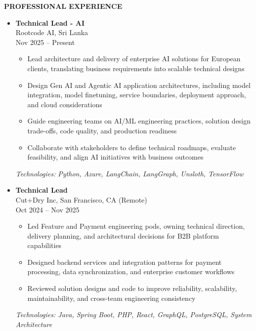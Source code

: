 \documentclass[a4paper,10pt]{article}
\newcommand{\ressection}[1]{
  \vspace{0.2em}
  \noindent\textbf{\large #1}
  \vspace{0.1em}
  \par
}
\begin{document}
\vspace{0.5em}
\ressection{PROFESSIONAL EXPERIENCE}
\begin{itemize}
    \item \textbf{Technical Lead - AI} \\
          Rootcode AI, Sri Lanka \\
          Nov 2025 -- Present
          \begin{itemize}[leftmargin=0.25in,label=$\circ$,itemsep=1pt]
              \item Lead architecture and delivery of enterprise AI solutions for European clients, translating business requirements into scalable technical designs
              \item Design Gen AI and Agentic AI application architectures, including model integration, model finetuning, service boundaries, deployment approach, and cloud considerations
              \item Guide engineering teams on AI/ML engineering practices, solution design trade-offs, code quality, and production readiness
              \item Collaborate with stakeholders to define technical roadmaps, evaluate feasibility, and align AI initiatives with business outcomes
          \end{itemize}
          \textit{Technologies: Python, Azure, LangChain, LangGraph, Unsloth, TensorFlow}
          
    \item \textbf{Technical Lead} \\
          Cut+Dry Inc, San Francisco, CA (Remote) \\
          Oct 2024 -- Nov 2025
          \begin{itemize}[leftmargin=0.25in,label=$\circ$,itemsep=1pt]
              \item Led Feature and Payment engineering pods, owning technical direction, delivery planning, and architectural decisions for B2B platform capabilities
              \item Designed backend services and integration patterns for payment processing, data synchronization, and enterprise customer workflows
              \item Reviewed solution designs and code to improve reliability, scalability, maintainability, and cross-team engineering consistency
          \end{itemize}
          \textit{Technologies: Java, Spring Boot, PHP, React, GraphQL, PostgreSQL, System Architecture}
          

\end{itemize}
\end{document}

